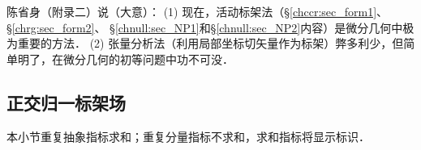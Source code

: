 {\kaishu 
    陈省身（\parencite{cc2001-zh}附录二）说（大意）：
    (1) 现在，活动标架法（\S \ref{chccr:sec_form1}、\S\ref{chrg:sec_form2}、
    \S\ref{chnull:sec_NP1}和\S\ref{chnull:sec_NP2}内容）是微分几何中极为重要的方法．
    (2) 张量分析法（利用局部坐标切矢量作为标架）弊多利少，但简单明了，在微分几何的初等问题中功不可没．
}


%


\subsection{正交归一标架场}\label{chrg:sec_E3-Orthogonal-Normalization}
本小节重复抽象指标求和；重复分量指标不求和，求和指标将显示标识．

